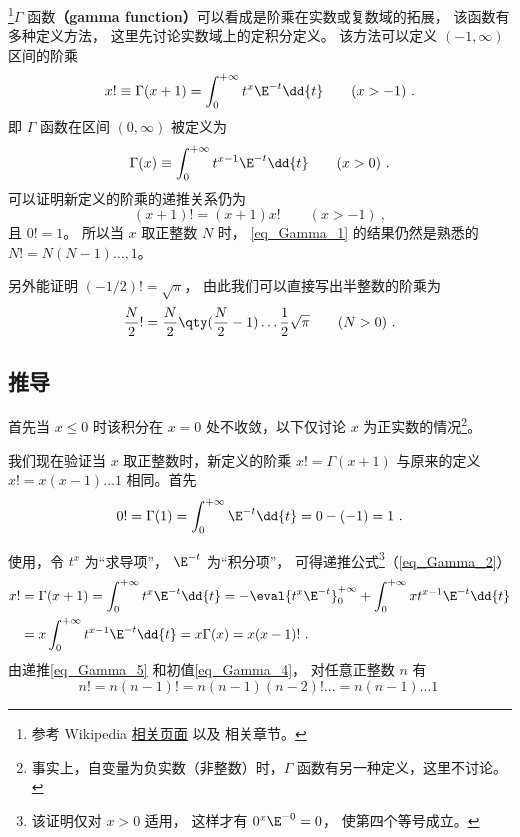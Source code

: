 

\footnote{参考 Wikipedia \href{https://en.wikipedia.org/wiki/Gamma_function}{相关页面} 以及 \cite{Arfken} 相关章节。}$\Gamma$ 函数\textbf{（gamma function）}可以看成是阶乘在实数或复数域的拓展， 该函数有多种定义方法， 这里先讨论实数域上的定积分定义。 该方法可以定义 $(-1, \infty)$ 区间的阶乘
\begin{equation}\label{eq_Gamma_1}
x! \equiv \Gamma (x + 1) = \int_0^{+\infty} t^x \E^{-t} \dd{t} \qquad (x > -1)~.
\end{equation}
即 $\Gamma$ 函数在区间 $(0,\infty)$ 被定义为
\begin{equation}\label{eq_Gamma_3}
\Gamma(x) \equiv \int_0^{+\infty} t^{x-1} \E^{-t} \dd{t} \qquad (x > 0)~.
\end{equation}
可以证明新定义的阶乘的递推关系仍为
\begin{equation}\label{eq_Gamma_2}
(x+1)!=(x+1)x! \qquad (x>-1)~,
\end{equation}
且 $0! = 1$。 所以当 $x$ 取正整数 $N$ 时， \autoref{eq_Gamma_1} 的结果仍然是熟悉的 $N! = N(N-1)\dots, 1$。

另外能证明 $(-1/2)!=\sqrt{\pi}$， 由此我们可以直接写出半整数的阶乘为
\begin{equation}
\frac{N}{2}! = \frac{N}{2} \qty(\frac{N}{2}-1) \dots \frac12 \sqrt{\pi} \qquad (N > 0)~.
\end{equation}

\subsection{推导}
首先当 $x \leqslant 0$ 时该积分在 $x=0$ 处不收敛，以下仅讨论 $x$ 为正实数的情况\footnote{事实上，自变量为负实数（非整数）时，$\Gamma$ 函数有另一种定义，这里不讨论。}。

我们现在验证当 $x$ 取正整数时，新定义的阶乘 $x! = \Gamma(x+1)$ 与原来的定义 $x! = x(x-1)\dots 1$ 相同。首先
\begin{equation}\label{eq_Gamma_4}
0! = \Gamma(1) = \int_0^{+\infty} \E^{-t} \dd{t} = 0 - (-1) = 1~.
\end{equation}

使用，令 $t^x$ 为“求导项”， $\E^{-t}$ 为“积分项”， 可得递推公式\footnote{该证明仅对 $x>0$ 适用， 这样才有 $0^x \E^{-0} = 0$， 使第四个等号成立。}（\autoref{eq_Gamma_2}）
\begin{equation}\label{eq_Gamma_5}
\begin{aligned}
x! &= \Gamma(x+1) = \int_0^{+\infty} t^x \E^{-t} \dd{t} =  - \eval{t^x \E^{-t}}_{0}^{+\infty} + \int_0^{+\infty} x t^{x-1} \E^{-t} \dd{t} \\
&= x\int_0^{+\infty} t^{x-1} \E^{-t} \dd{t} = x\Gamma (x) = x(x-1)!~.
\end{aligned} \end{equation} 
由递推\autoref{eq_Gamma_5} 和初值\autoref{eq_Gamma_4}， 对任意正整数 $n$ 有
\begin{equation}
n! = n(n-1)! = n(n-1)(n-2)!... = n(n-1)...1~
\end{equation}

